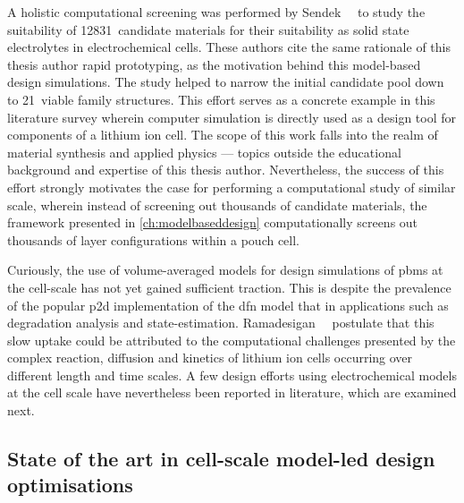 A      holistic      computational      screening     was      performed      by
Sendek~\etal~\cite{Sendek2017}  to  study  the  suitability  of  12831~candidate
materials for their  suitability as solid state  electrolytes in electrochemical
cells. These authors  cite the same rationale of this  thesis author \ie{} rapid
prototyping, as the  motivation behind this model-based  design simulations. The
study  helped to  narrow the  initial candidate  pool down  to 21~viable  family
structures. This effort  serves as a concrete example in  this literature survey
wherein computer simulation is directly used  as a design tool for components of
a lithium  ion cell. The  scope of  this work falls  into the realm  of material
synthesis and applied physics ---  topics outside the educational background and
expertise  of this  thesis  author.  Nevertheless, the  success  of this  effort
strongly  motivates the  case for  performing a  computational study  of similar
scale, wherein  instead of screening  out thousands of candidate  materials, the
framework  presented in  \cref{ch:modelbaseddesign} computationally  screens out
thousands of layer configurations within a pouch cell.

Curiously,  the  use  of  volume-averaged   models  for  design  simulations  of
\glspl{pbm} at  the cell-scale has not  yet gained sufficient traction.  This is
despite the prevalence of the  popular \gls{p2d} implementation of the \gls{dfn}
model that  in applications such  as degradation analysis  and state-estimation.
Ramadesigan~\etal~\cite{Ramadesigan2012} postulate  that this slow  uptake could
be attributed to the computational challenges presented by the complex reaction,
diffusion and kinetics of lithium ion  cells occurring over different length and
time scales. A few design efforts using electrochemical models at the cell scale
have nevertheless been reported in literature, which are examined next.

\subsection{State of the art in cell-scale model-led design optimisations}

